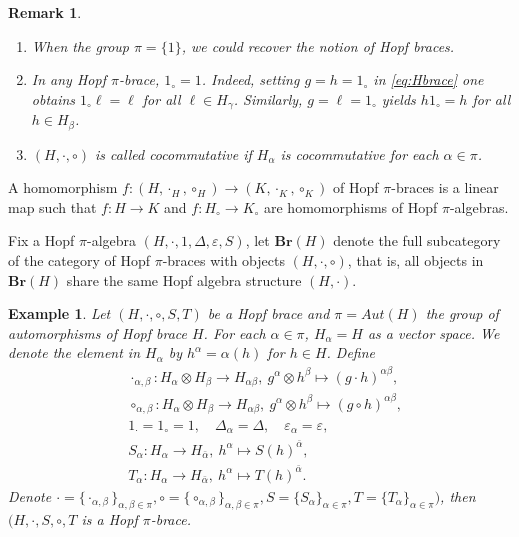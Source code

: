 \documentclass[11pt]{article}
\def\a{\alpha}
\def\b{\beta}
\def\g{\gamma}
\def\o{\otimes}
\def\v{\varepsilon}
\newtheorem{example}[theorem]{Example}
\newtheorem{remark}[theorem]{Remark}
\begin{document}
\begin{remark}
\begin{enumerate}[\rm(1)]
  \item When the group $\pi=\{1\}$, we could recover the notion of Hopf braces.
  \item In any Hopf $\pi$-brace, $1_\circ=1$. Indeed, setting $g=h=1_\circ$ in \eqref{eq:Hbrace} one obtains $1_\circ \ell=\ell$ for all $\ell\in H_\g$. Similarly, $g=\ell=1_\circ$ yields $h1_\circ=h$ for all $h\in H_\b$.
  \item  $(H,\cdot,\circ)$ is called cocommutative if $H_\a$ is cocommutative for each $\a\in\pi$.
\end{enumerate}
\end{remark}

A homomorphism $f:(H,\cdot_H,\circ_H)\rightarrow(K,\cdot_K,\circ_K)$ of Hopf $\pi$-braces is a linear map such that $f:H\rightarrow K$ and $f:H_{\circ}\rightarrow K_{\circ}$ are homomorphisms of Hopf $\pi$-algebras. 

Fix a Hopf $\pi$-algebra $(H,\cdot,1,\Delta,\v,S)$, let $\mathbf{Br}(H)$ denote the full subcategory of the category of Hopf $\pi$-braces with objects $(H,\cdot,\circ)$, that is, all objects in $\mathbf{Br}(H)$ share the same Hopf algebra structure $(H,\cdot)$.

\begin{example}
Let $(H,\cdot,\circ,S,T)$ be a Hopf brace and $\pi=Aut(H)$ the group of automorphisms of Hopf brace $H$. For each $\a\in\pi$, $H_\a=H$ as a vector space. We denote the element in $H_\a$ by $h^\a=\a(h)$ for $h\in H$. Define
\begin{align*}
&\cdot_{\a,\b}:H_\a\o H_\b\rightarrow H_{\a\b},\ g^\a\o h^\b\mapsto (g \cdot h)^{\a\b},\\
&\circ_{\a,\b}:H_\a\o H_\b\rightarrow H_{\a\b},\ g^\a\o h^\b\mapsto (g \circ h)^{\a\b},\\
&1_\cdot=1_\circ=1,\quad \Delta_\a=\Delta,\quad \varepsilon_\a=\varepsilon,\\
&S_\a:H_\a\rightarrow H_{\bar{\a}},\ h^\a\mapsto S(h)^{\bar{\a}},\\
&T_\a:H_\a\rightarrow H_{\bar{\a}},\ h^\a\mapsto T(h)^{\bar{\a}}.
\end{align*}
Denote $\cdot=\{\cdot_{\a,\b}\}_{\a,\b\in\pi},\circ=\{\circ_{\a,\b}\}_{\a,\b\in\pi},S=\{S_\a\}_{\a\in\pi},T=\{T_\a\}_{\a\in\pi})$, then $(H,\cdot,S,\circ,T$ is a Hopf $\pi$-brace.
\end{example}
\end{document}
